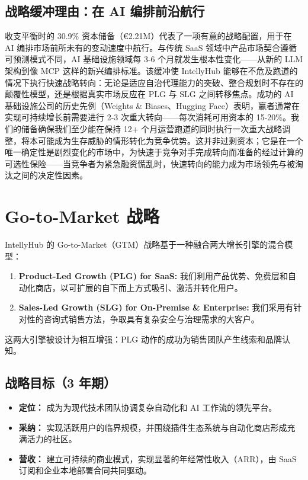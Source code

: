 \documentclass[11pt, a4paper, oneside]{article}
\begin{document}
\subsection{战略缓冲理由：在 AI 编排前沿航行}
收支平衡时的 30.9\% 资本储备（€2.21M）代表了一项有意的战略配置，用于在 AI 编排市场前所未有的变动速度中航行。与传统 SaaS 领域中产品市场契合遵循可预测模式不同，AI 基础设施领域每 3-6 个月就发生根本性变化——从新的 LLM 架构到像 MCP 这样的新兴编排标准。该缓冲使 IntellyHub 能够在不危及跑道的情况下执行快速战略转向：无论是适应自治代理能力的突破、整合规划时不存在的颠覆性模型，还是根据真实市场反应在 PLG 与 SLG 之间转移焦点。成功的 AI 基础设施公司的历史先例（Weights \& Biases、Hugging Face）表明，赢者通常在实现可持续增长前需要进行 2-3 次重大转向——每次消耗可用资本的 15-20\%。我们的储备确保我们至少能在保持 12+ 个月运营跑道的同时执行一次重大战略调整，将本可能成为生存威胁的情形转化为竞争优势。这并非过剩资本；它是在一个唯一确定性是剧烈变化的市场中，为快速于竞争对手完成转向而准备的经过计算的可选性保险——当竞争者为紧急融资慌乱时，快速转向的能力成为市场领先与被淘汰之间的决定性因素。

\newpage
\section{Go-to-Market 战略}

IntellyHub 的 Go-to-Market（GTM）战略基于一种融合两大增长引擎的混合模型：
\begin{enumerate}
    \item \textbf{Product-Led Growth (PLG) for SaaS:} 我们利用产品优势、免费层和自动化商店，以可扩展的自下而上方式吸引、激活并转化用户。
    \item \textbf{Sales-Led Growth (SLG) for On-Premise \& Enterprise:} 我们采用有针对性的咨询式销售方法，争取具有复杂安全与治理需求的大客户。
\end{enumerate}
这两大引擎被设计为相互增强：PLG 动作的成功为销售团队产生线索和品牌认知。



\subsection{战略目标（3 年期）}
\begin{itemize}
    \item \textbf{定位：} 成为为现代技术团队协调复杂自动化和 AI 工作流的领先平台。
    \item \textbf{采纳：} 实现活跃用户的临界规模，并围绕插件生态系统与自动化商店形成充满活力的社区。
    \item \textbf{营收：} 建立可持续的商业模式，实现显著的年经常性收入（ARR），由 SaaS 订阅和企业本地部署合同共同驱动。
\end{itemize}
\end{document}

